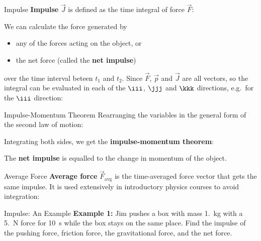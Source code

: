\documentclass[12pt,compress,aspectratio=169]{beamer}
\begin{document}
\begin{frame}{Impulse}
  \textbf{Impulse} $\vec J$ is defined as the time integral of force $\vec F$:


  We can calculate the force generated by
  \begin{itemize}
  \item any of the forces acting on the object, or
  \item the net force (called the \textbf{net impulse})
  \end{itemize}
  over the time interval beteen $t_1$ and $t_2$. Since $\vec F$, $\vec p$ and
  $\vec J$ are all vectors, so the integral can be evaluated in each of the
  $\iii$, $\jjj$ and $\kkk$ directions, e.g.\ for the $\iii$ direction:
  
\end{frame}



\begin{frame}{Impulse-Momentum Theorem}
  Rearranging the variables in the general form of the second law of motion:
  

  Integrating both sides, we get the \textbf{impulse-momentum theorem}:
 
  
  The \textbf{net impulse} is equalled to the change in momentum of the object.
\end{frame}



\begin{frame}{Average Force}
  \textbf{Average force} $\vec F_\text{avg}$ is the time-averaged force vector
  that gets the same impulse. It is used extensively in introductory physics
  courses to avoid integration:

\end{frame}



\begin{frame}{Impulse: An Example}
  \textbf{Example 1:} Jim pushes a box with mass \SI{1.}{\kilo\gram} with a
  \SI{5.}{\newton} force for \SI{10}{\second} while the box stays on the same
  place. Find the impulse of the pushing force, friction force, the
  gravitational force, and the net force.
\end{frame}
\end{document}
